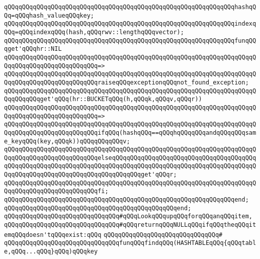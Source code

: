 \verb|qQQqqQQqqQQqqQQqqQQqqQQqqQQqqQQqqQQqqQQqqQQqqQQqqQQqqQQqqQQqqQQqhashqQQq=qQQqhash_valueqQQqkey;|\newline
\verb|qQQqqQQqqQQqqQQqqQQqqQQqqQQqqQQqqQQqqQQqqQQqqQQqqQQqqQQqqQQqqQQqindexqQQq=qQQqindexqQQq(hash,qQQqrwv::lengthqQQqvector);|\newline
\newline
\verb|qQQqqQQqqQQqqQQqqQQqqQQqqQQqqQQqqQQqqQQqqQQqqQQqqQQqqQQqqQQqqQQqfunqQQqget'qQQqhr::NIL|\newline
\verb|qQQqqQQqqQQqqQQqqQQqqQQqqQQqqQQqqQQqqQQqqQQqqQQqqQQqqQQqqQQqqQQqqQQqqQQqqQQqqQQqqQQqqQQqqQQqqQQq=>|\newline
\verb|qQQqqQQqqQQqqQQqqQQqqQQqqQQqqQQqqQQqqQQqqQQqqQQqqQQqqQQqqQQqqQQqqQQqqQQqqQQqqQQqqQQqqQQqqQQqqQQqraiseqQQqexceptionqQQqnot_found_exception;|\newline
\newline
\verb|qQQqqQQqqQQqqQQqqQQqqQQqqQQqqQQqqQQqqQQqqQQqqQQqqQQqqQQqqQQqqQQqqQQqqQQqqQQqqQQqget'qQQq(hr::BUCKETqQQq(h,qQQqk,qQQqv,qQQqr))|\newline
\verb|qQQqqQQqqQQqqQQqqQQqqQQqqQQqqQQqqQQqqQQqqQQqqQQqqQQqqQQqqQQqqQQqqQQqqQQqqQQqqQQqqQQqqQQqqQQqqQQq=>|\newline
\verb|qQQqqQQqqQQqqQQqqQQqqQQqqQQqqQQqqQQqqQQqqQQqqQQqqQQqqQQqqQQqqQQqqQQqqQQqqQQqqQQqqQQqqQQqqQQqqQQqifqQQq(hashqQQq==qQQqhqQQqqQQqandqQQqqQQqsame_keyqQQq(key,qQQqk))qQQqqQQqqQQqv;|\newline
\verb|qQQqqQQqqQQqqQQqqQQqqQQqqQQqqQQqqQQqqQQqqQQqqQQqqQQqqQQqqQQqqQQqqQQqqQQqqQQqqQQqqQQqqQQqqQQqqQQqelseqQQqqQQqqQQqqQQqqQQqqQQqqQQqqQQqqQQqqQQqqQQqqQQqqQQqqQQqqQQqqQQqqQQqqQQqqQQqqQQqqQQqqQQqqQQqqQQqqQQqqQQqqQQqqQQqqQQqqQQqqQQqqQQqqQQqqQQqqQQqqQQqqQQqget'qQQqr;|\newline
\verb|qQQqqQQqqQQqqQQqqQQqqQQqqQQqqQQqqQQqqQQqqQQqqQQqqQQqqQQqqQQqqQQqqQQqqQQqqQQqqQQqqQQqqQQqqQQqqQQqfi;|\newline
\verb|qQQqqQQqqQQqqQQqqQQqqQQqqQQqqQQqqQQqqQQqqQQqqQQqqQQqqQQqqQQqqQQqend;|\newline
\verb|qQQqqQQqqQQqqQQqqQQqqQQqqQQqqQQqqQQqqQQqqQQqqQQqend;|\newline
\newline
\verb|qQQqqQQqqQQqqQQqqQQqqQQqqQQqqQQq#qQQqLookqQQqupqQQqforqQQqanqQQqitem,|\newline
\verb|qQQqqQQqqQQqqQQqqQQqqQQqqQQqqQQq#qQQqreturnqQQqNULLqQQqifqQQqtheqQQqitemqQQqdoesn'tqQQqexist:qQQq|\newline
\verb|qQQqqQQqqQQqqQQqqQQqqQQqqQQqqQQq#|\newline
\verb|qQQqqQQqqQQqqQQqqQQqqQQqqQQqqQQqfunqQQqfindqQQq(HASHTABLEqQQq{qQQqtable,qQQq...qQQq}qQQq)qQQqkey|\newline
